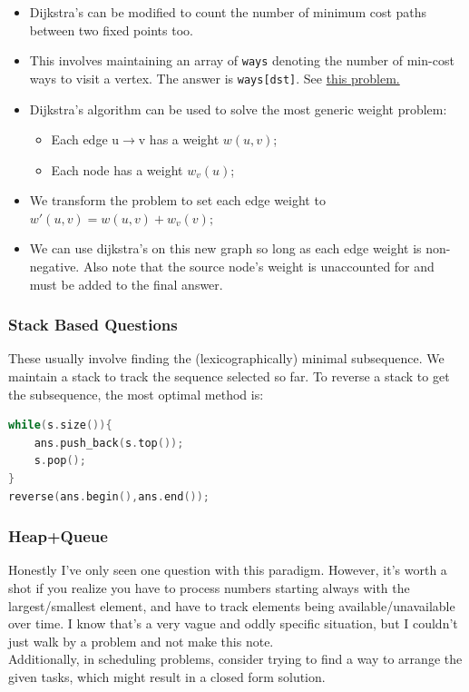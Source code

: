\documentclass{report}
\begin{document}
\begin{itemize}
\item Dijkstra's can be modified to count the number of minimum cost paths between two fixed points too.
\item This involves maintaining an array of \texttt{ways} denoting the number of min-cost ways to visit a vertex. The answer is \texttt{ways[dst]}. See \href{https://leetcode.com/problems/number-of-ways-to-arrive-at-destination/}{this problem.}
\item Dijkstra's algorithm can be used to solve the most generic weight problem:
\begin{itemize}
    \item Each edge u$\rightarrow$v has a weight $w(u,v)$;
    \item Each node has a weight $w_v(u)$;
\end{itemize}
\item We transform the problem to set each edge weight to $w'(u,v) = w(u,v) + w_v(v);$
\item We can use dijkstra's on this new graph so long as each edge weight is non-negative. Also note that the source node's weight is unaccounted for and must be added to the final answer.
\end{itemize}

\subsubsection*{Stack Based Questions}
These usually involve finding the (lexicographically) minimal
subsequence. We maintain a stack to track the sequence
selected so far. To reverse a stack to get the subsequence, the
most optimal method is:
\begin{lstlisting}[language=C++]
while(s.size()){
    ans.push_back(s.top());
    s.pop();
}
reverse(ans.begin(),ans.end());
\end{lstlisting}
\subsubsection*{Heap+Queue}
Honestly I've only seen one question with this paradigm. However,
it's worth a shot if you realize you have to process numbers
starting always with the largest/smallest element, and have to 
track elements being available/unavailable over time.
I know that's a very vague and oddly specific situation,
but I couldn't just walk by a problem and not make this note.
\\
Additionally, in scheduling problems, consider trying to find
a way to arrange the given tasks, which might result in a
closed form solution.
\end{document}
